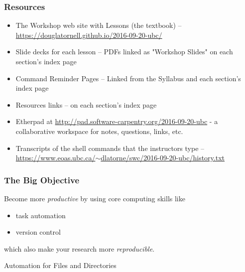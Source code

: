\documentclass{beamer}
\begin{document}
\begin{frame}
  \frametitle{Resources}
  \begin{itemize}
    \item The Workshop web site with Lessons (the textbook) -- \href{https://douglatornell.github.io/2016-09-20-ubc/}{https://douglatornell.github.io/2016-09-20-ubc/}
    \item Slide decks for each lesson -- PDFs linked as "Workshop Slides" on each section's index page
    \item Command Reminder Pages -- Linked from the Syllabus and each section's index page
    \item Resources links -- on each section's index page
    \item Etherpad at \href{http://pad.software-carpentry.org/2016-09-20-ubc}{http://pad.software-carpentry.org/2016-09-20-ubc} - a collaborative workspace for notes, questions, links, etc.
    \item Transcripts of the shell commands that the instructors type -- \href{https://www.eoas.ubc.ca/~dlatorne/swc/2016-09-20-ubc/history.txt}{https://www.eoas.ubc.ca/$\sim$dlatorne/swc/2016-09-20-ubc/history.txt}
  \end{itemize}
\end{frame}


\begin{frame}
  \frametitle{The Big Objective}
  Become more {\em productive} by using core computing skills like
  \begin{itemize}
    \item task automation
    \item version control
  \end{itemize}
  which also make your research more {\em reproducible}.
\end{frame}


\begin{frame}
  \begin{block}{Automation for Files and Directories}
  \end{block}
\end{frame}
\end{document}
